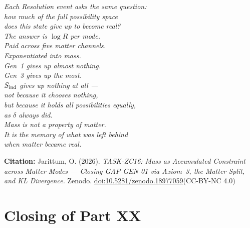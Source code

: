 \documentclass[12pt, a4paper]{article}
\begin{document}
\bigskip
\begin{center}
\textit{
  Each Resolution event asks the same question:\\
  how much of the full possibility space\\
  does this state give up to become real?\\[0.5em]
  The answer is $\log R$ per mode.\\
  Paid across five matter channels.\\
  Exponentiated into mass.\\[0.5em]
  Gen~1 gives up almost nothing.\\
  Gen~3 gives up the most.\\[0.5em]
  $S_{\rm ind}$ gives up nothing at all ---\\
  not because it chooses nothing,\\
  but because it holds all possibilities equally,\\
  as $\delta$ always did.\\[0.5em]
  Mass is not a property of matter.\\
  It is the memory of what was left behind\\
  when matter became real.
}
\end{center}

\bigskip
\begin{center}
\textbf{Citation:} Jarittum, O. (2026).
\textit{TASK-ZC16: Mass as Accumulated Constraint across
Matter Modes --- Closing GAP-GEN-01 via Axiom~3, the Matter
Split, and KL Divergence.}
Zenodo. \href{https://doi.org/10.5281/zenodo.18977059}%
{doi:10.5281/zenodo.18977059}\quad (CC-BY-NC 4.0)
\end{center}

\bigskip


\section*{Closing of Part XX}
\end{document}
